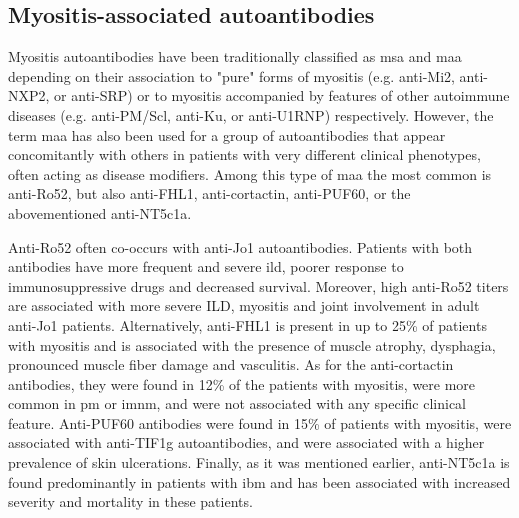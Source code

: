 \subsection{Myositis-associated autoantibodies}

Myositis autoantibodies have been traditionally classified as \gls{msa} and \gls{maa} depending on their association to "pure" forms of myositis (e.g. anti-Mi2, anti-NXP2, or anti-SRP) or to myositis accompanied by features of other autoimmune diseases (e.g. anti-PM/Scl, anti-Ku, or anti-U1RNP) respectively.\cite{McHugh2018} However, the term \gls{maa} has also been used for a group of autoantibodies that appear concomitantly with others in patients with very different clinical phenotypes, often acting as disease modifiers. Among this type of \gls{maa} the most common is anti-Ro52,\cite{PinalFernandez2017a,Vancsa2009,Bauhammer2016,Marie2012} but also anti-FHL1,\cite{Albrecht2015} anti-cortactin,\cite{LabradorHorrillo2014a} anti-PUF60,\cite{Fiorentino2016,Zhang2018} or the abovementioned anti-NT5c1a.\cite{Lloyd2016,Herbert2016,Muro2017,Lilleker2017,Goyal2016}

Anti-Ro52 often co-occurs with anti-Jo1 autoantibodies. Patients with both antibodies have more frequent and severe \gls{ild}, poorer response to immunosuppressive drugs and decreased survival.\cite{PinalFernandez2017a,Vancsa2009,Bauhammer2016,Marie2012} Moreover, high anti-Ro52 titers are associated with more severe ILD, myositis and joint involvement in adult anti-Jo1 patients.\cite{PinalFernandez2017a,Vancsa2009,Bauhammer2016,Marie2012} Alternatively, anti-FHL1 is present in up to 25\% of patients with myositis and is associated with the presence of muscle atrophy, dysphagia, pronounced muscle fiber damage and vasculitis.\cite{Albrecht2015} As for the anti-cortactin antibodies, they were found in 12\% of the patients with myositis, were more common in \gls{pm} or \gls{imnm}, and were not associated with any specific clinical feature.\cite{LabradorHorrillo2014a} Anti-PUF60 antibodies were found in 15\% of patients with myositis, were associated with anti-TIF1g autoantibodies, and were associated with a higher prevalence of skin ulcerations.\cite{Fiorentino2016,Zhang2018} Finally, as it was mentioned earlier, anti-NT5c1a is found predominantly in patients with \gls{ibm} and has been associated with increased severity and mortality in these patients.\cite{Lloyd2016,Herbert2016,Muro2017,Lilleker2017,Goyal2016}

